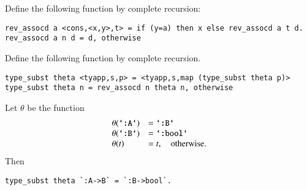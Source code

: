 \begin{definition}
Define the following function by complete recursion:
\begin{verbatim}
rev_assocd a <cons,<x,y>,t> = if (y=a) then x else rev_assocd a t d.
rev_assocd a n d = d, otherwise
\end{verbatim}
\end{definition}

\begin{definition}
Define the following function by complete recursion.
\begin{verbatim}
type_subst theta <tyapp,s,p> = <tyapp,s,map (type_subst theta p)>
type_subst theta n = rev_assocd n theta n, otherwise
\end{verbatim}
\end{definition}

\begin{example}
Let $\theta$ be the function
$$
\begin{array}{lll}
\theta(\verb!`:A`!) &=\verb!`:B`!\\
\theta(\verb!`:B`!) &=\verb!`:bool`!\\
\theta(t) &= t,\quad\hbox{otherwise}.
\end{array}
$$
Then
\begin{verbatim}
type_subst theta `:A->B` = `:B->bool`.
\end{verbatim}
\end{example}






